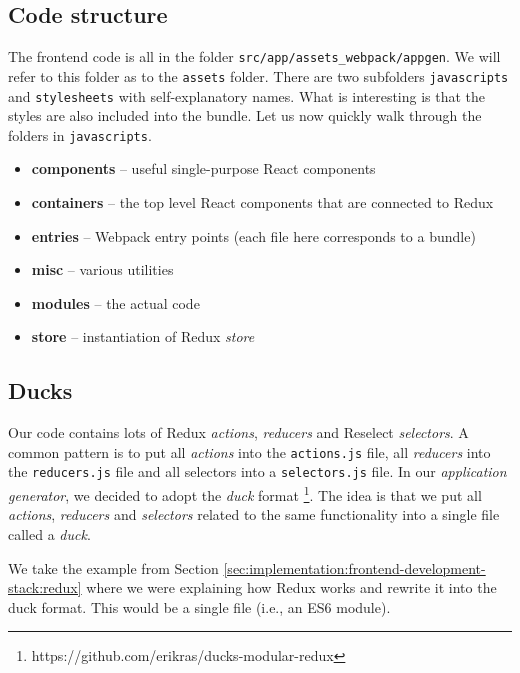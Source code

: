 \subsection{Code structure}

The frontend code is all in the folder \texttt{src/app/assets\_webpack/appgen}. We will refer to this folder as to the \texttt{assets} folder. There are two subfolders \texttt{javascripts} and \texttt{stylesheets} with self-explanatory names. What is interesting is that the styles are also included into the bundle.  Let us now quickly walk through the folders in \texttt{javascripts}.

\begin{itemize}
\item \textbf{components} -- useful single-purpose React components
\item \textbf{containers} -- the top level React components that are connected to Redux
\item \textbf{entries} -- Webpack entry points (each file here corresponds to a bundle)
\item \textbf{misc} -- various utilities
\item \textbf{modules} -- the actual code
\item \textbf{store} -- instantiation of Redux \emph{store}

\end{itemize}
\subsection{Ducks}

Our code contains lots of Redux \emph{actions}, \emph{reducers} and Reselect \emph{selectors}. A common pattern is to put all \emph{actions} into the \texttt{actions.js} file, all \emph{reducers} into the \texttt{reducers.js} file and all selectors into a \texttt{selectors.js} file. In our \emph{application generator}, we decided to adopt the \emph{duck} format \footnote{https://github.com/erikras/ducks-modular-redux}. The idea is that we put all \emph{actions}, \emph{reducers} and \emph{selectors} related to the same functionality into a single file called a \emph{duck}. 

We take the example from Section \ref{sec:implementation:frontend-development-stack:redux} where we were explaining how Redux works and rewrite it into the duck format. This would be a single file (i.e., an ES6 module).


